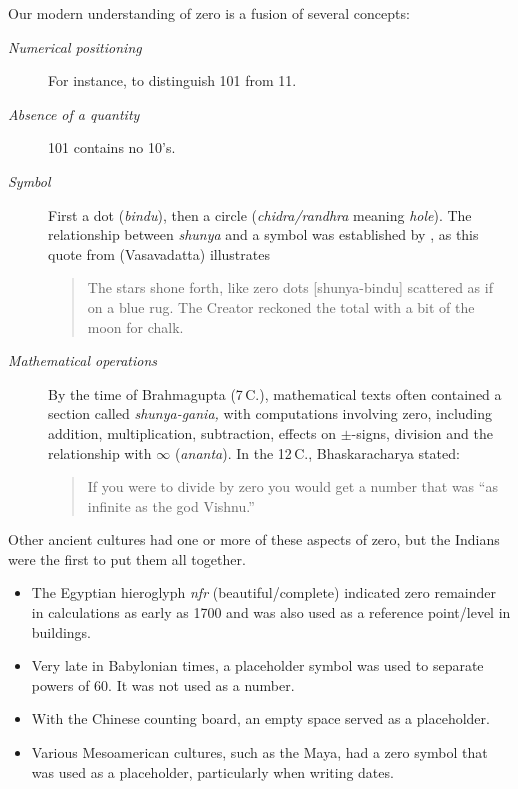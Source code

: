 Our modern understanding of zero is a fusion of several concepts:
\begin{description}
	\item[\normalfont\emph{Numerical positioning}] For instance, to distinguish 101 from 11.
	\item[\normalfont\emph{Absence of a quantity}] 101 contains no 10's.
	\item[\normalfont\emph{Symbol}] First a dot (\emph{bindu}), then a circle (\emph{chidra/randhra} meaning \emph{hole}). The relationship between \emph{shunya} and a symbol was established by , as this quote from  (Vasavadatta) illustrates
	\begin{quote}
		The stars shone forth, like zero dots [shunya-bindu] scattered as if on a blue rug. The Creator reckoned the total with a bit of the moon for chalk.
	\end{quote}
	\item[\normalfont\emph{Mathematical operations}] By the time of Brahmagupta (7\th\,C.), mathematical texts often contained a section called \emph{shunya-gania,} with computations involving zero, including addition, multiplication, subtraction, effects on $\pm$-signs, division and the relationship with $\infty$ (\emph{ananta}). In the 12\th\,C., Bhaskaracharya stated:
	\begin{quote}
	If you were to divide by zero you would get a number that was ``as infinite as the god Vishnu.''
	\end{quote}
\end{description}


Other ancient cultures had one or more of these aspects of zero, but the Indians were the first to put them all together.
\begin{itemize}
  \item The Egyptian hieroglyph \emph{nfr} (beautiful/complete) indicated zero remainder in calculations as early as 1700\BC{} and was also used as a reference point/level in buildings.
  \item Very late in Babylonian times, a placeholder symbol was used to separate powers of 60. It was not used as a number.
  \item With the Chinese counting board, an empty space served as a placeholder.
  \item Various Mesoamerican cultures, such as the Maya, had a zero symbol that was used as a placeholder, particularly when writing dates. 
\end{itemize}


